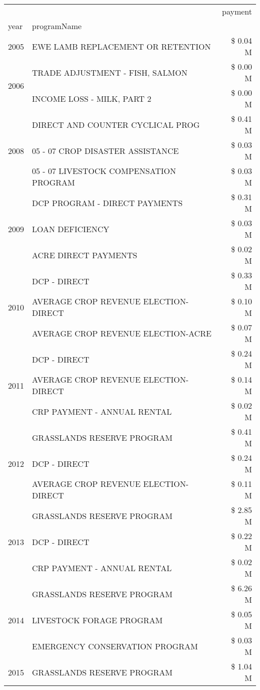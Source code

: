 \begin{tabular}{llr}
\toprule
 &  & payment \\
year & programName &  \\
\midrule
2005 & EWE LAMB REPLACEMENT OR RETENTION & \$ 0.04 M \\
\cline{1-3}
\multirow[t]{2}{*}{2006} & TRADE ADJUSTMENT - FISH, SALMON & \$ 0.00 M \\
 & INCOME LOSS - MILK, PART 2 & \$ 0.00 M \\
\cline{1-3}
\multirow[t]{3}{*}{2008} & DIRECT AND COUNTER CYCLICAL PROG & \$ 0.41 M \\
 & 05 - 07 CROP DISASTER ASSISTANCE & \$ 0.03 M \\
 & 05 - 07 LIVESTOCK COMPENSATION PROGRAM & \$ 0.03 M \\
\cline{1-3}
\multirow[t]{3}{*}{2009} & DCP PROGRAM - DIRECT PAYMENTS & \$ 0.31 M \\
 & LOAN DEFICIENCY & \$ 0.03 M \\
 & ACRE DIRECT PAYMENTS & \$ 0.02 M \\
\cline{1-3}
\multirow[t]{3}{*}{2010} & DCP - DIRECT & \$ 0.33 M \\
 & AVERAGE CROP REVENUE ELECTION-DIRECT & \$ 0.10 M \\
 & AVERAGE CROP REVENUE ELECTION-ACRE & \$ 0.07 M \\
\cline{1-3}
\multirow[t]{3}{*}{2011} & DCP - DIRECT & \$ 0.24 M \\
 & AVERAGE CROP REVENUE ELECTION-DIRECT & \$ 0.14 M \\
 & CRP PAYMENT - ANNUAL RENTAL & \$ 0.02 M \\
\cline{1-3}
\multirow[t]{3}{*}{2012} & GRASSLANDS RESERVE PROGRAM & \$ 0.41 M \\
 & DCP - DIRECT & \$ 0.24 M \\
 & AVERAGE CROP REVENUE ELECTION-DIRECT & \$ 0.11 M \\
\cline{1-3}
\multirow[t]{3}{*}{2013} & GRASSLANDS RESERVE PROGRAM & \$ 2.85 M \\
 & DCP - DIRECT & \$ 0.22 M \\
 & CRP PAYMENT - ANNUAL RENTAL & \$ 0.02 M \\
\cline{1-3}
\multirow[t]{3}{*}{2014} & GRASSLANDS RESERVE PROGRAM & \$ 6.26 M \\
 & LIVESTOCK FORAGE PROGRAM & \$ 0.05 M \\
 & EMERGENCY CONSERVATION PROGRAM & \$ 0.03 M \\
\cline{1-3}
\multirow[t]{3}{*}{2015} & GRASSLANDS RESERVE PROGRAM & \$ 1.04 M \\

\end{tabular}
